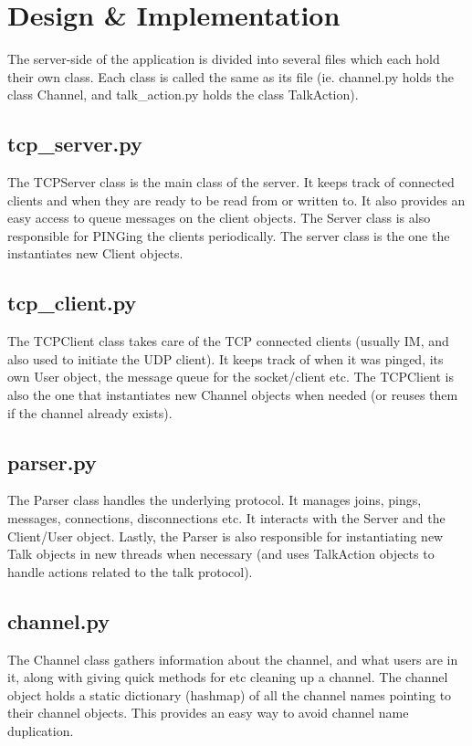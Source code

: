 \documentclass[12pt]{rapport}
\begin{document}
\section*{Design \& Implementation}
The server-side of the application is divided into several files which
each hold their own class. Each class is called the same as its file
(ie. channel.py holds the class Channel, and talk\_action.py holds the
class TalkAction).

\subsection*{tcp\_server.py}
The TCPServer class is the main class of the server. It keeps track of
connected clients and when they are ready to be read from or written
to. It also provides an easy access to queue messages on the client
objects. The Server class is also responsible for PINGing the clients
periodically. The server class is the one the instantiates new Client
objects.

\subsection*{tcp\_client.py}
The TCPClient class takes care of the TCP connected clients (usually
IM, and also used to initiate the UDP client). It keeps track of when
it was pinged, its own User object, the message queue for the
socket/client etc. The TCPClient is also the one that instantiates new
Channel objects when needed (or reuses them if the channel already
exists).

\subsection*{parser.py}
The Parser class handles the underlying protocol. It manages joins,
pings, messages, connections, disconnections etc. It interacts with
the Server and the Client/User object. Lastly, the Parser is also
responsible for instantiating new Talk objects in new threads when
necessary (and uses TalkAction objects to handle actions related to
the talk protocol).

\subsection*{channel.py}
The Channel class gathers information about the channel, and what
users are in it, along with giving quick methods for etc cleaning up a
channel. The channel object holds a static dictionary (hashmap) of all
the channel names pointing to their channel objects. This provides an
easy way to avoid channel name duplication.
\end{document}
